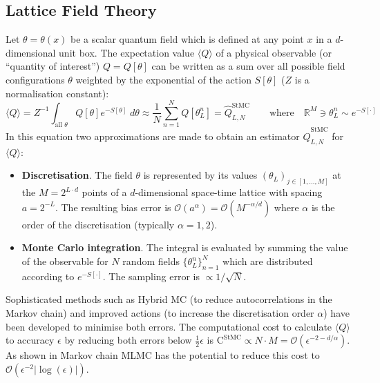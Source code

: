 \documentclass[11pt]{article}
\begin{document}
\subsection{Lattice Field Theory}
Let $\theta=\theta(x)$ be a scalar quantum field which is defined at any point $x$ in a $d$-dimensional unit box. The expectation value $\langle Q\rangle$ of a physical observable (or ``quantity of interest'') $Q=Q[\theta]$ can be written as a sum over all possible field configurations $\theta$ weighted by the exponential of the action $S[\theta]$ ($Z$ is a normalisation constant):
\begin{equation}
  \langle Q\rangle = Z^{-1} \int_{\text{all $\theta$}} Q[\theta]e^{-S[\theta]}\;d\theta \approx \frac{1}{N} \sum_{n=1}^N Q[\theta_L^n] = \hat{Q}^{\text{StMC}}_{L,N} \qquad\text{where}\quad \mathbb{R}^{M}\ni \theta_L^n\sim e^{-S[\cdot]}\label{eqn:StMCestimator}
\end{equation}
In this equation two approximations are made to obtain an estimator $\hat{Q}^{\text{StMC}}_{L,N}$ for $\langle Q\rangle$:
\begin{itemize}
\item \textbf{Discretisation}. The field $\theta$ is represented by its values $(\theta_L)_{j\in [1,\dots,M]}$ at the $M=2^{L\cdot d}$ points of a $d$-dimensional space-time lattice with spacing $a=2^{-L}$. The resulting bias error is $\mathcal{O}(a^\alpha)=\mathcal{O}(M^{-\alpha/d})$ where $\alpha$ is the order of the discretisation (typically $\alpha=1,2$).
    \item \textbf{Monte Carlo integration}. The integral is evaluated by summing the value of the observable for $N$ random fields $\{\theta_L^n\}_{n=1}^N$ which are distributed according to $e^{-S[\cdot ]}$. The sampling error is $\propto{1/\sqrt{N}}$.
\end{itemize}
Sophisticated methods such as Hybrid MC \cite{Duane1987} (to reduce autocorrelations in the Markov chain) and improved actions \cite{Lepage1994} (to increase the discretisation order $\alpha$) have been developed to minimise both errors.
The computational cost to calculate $\langle Q\rangle$ to accuracy $\epsilon$ by reducing both errors below $\frac{1}{2}\epsilon$ is $\text{C}^{\text{StMC}}\propto N\cdot M=\mathcal{O}(\epsilon^{-2-d/\alpha})$. As shown in \cite{Dodwell2015} Markov chain MLMC has the potential to reduce this cost to $\mathcal{O}(\epsilon^{-2}|\log(\epsilon)|)$.
\end{document}
